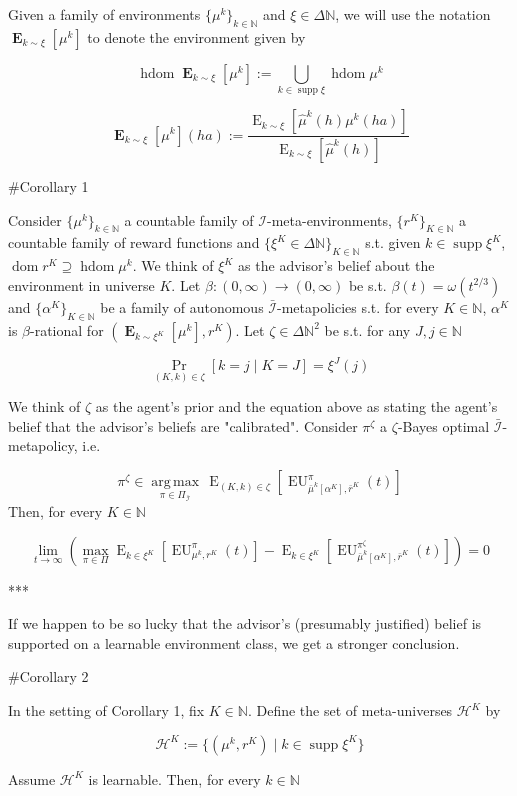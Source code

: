 \documentclass[a4paper]{article}
\DeclareMathOperator{\Supp}{supp}
\DeclareMathOperator{\Dom}{dom}
\newcommand{\E}{\operatorname{E}}
\newcommand{\Argmax}[1]{\underset{#1}{\operatorname{arg\,max}}\,}
\newcommand{\Nats}{\mathbb{N}}
\newcommand{\I}{\mathcal{I}}
\newcommand{\Adi}{\bar{\I}}
\DeclareMathOperator{\HD}{hdom}
\newcommand{\Hy}{\mathcal{H}}
\newcommand{\EU}{\operatorname{EU}}
\begin{document}
Given a family of environments $\{\mu^k\}_{k \in \Nats}$ and $\xi \in \Delta\Nats$, we will use the notation $\boldsymbol{\E}_{k \sim \xi}[\mu^k]$ to denote the environment given by

$$\HD{\boldsymbol{\E}_{k \sim \xi}[\mu^k]}:= \bigcup_{k \in \Supp \xi} \HD{\mu^k}$$

$$\boldsymbol{\E}_{k \sim \xi}[\mu^k](ha):=\frac{\E_{k \sim \xi}[ \hat{\mu}^k(h)\mu^k(ha)]}{\E_{k \sim \xi}[ \hat{\mu}^k(h)]}$$

\#Corollary 1

Consider $\{\mu^k\}_{k \in \Nats}$ a countable family of $\I$-meta-environments, $\{r^K\}_{K \in \Nats}$ a countable family of reward functions and $\{\xi^K \in \Delta\Nats\}_{K \in \Nats}$ s.t. given $k \in \Supp \xi^K$, $\Dom{r^K} \supseteq \HD{\mu^k}$. We think of $\xi^K$ as the advisor's belief about the environment in universe $K$. Let $\beta: (0,\infty) \rightarrow (0,\infty)$ be s.t. $\beta(t) = \omega(t^{2/3})$ and $\{\alpha^K\}_{K \in \Nats}$ be a family of autonomous $\Adi$-metapolicies s.t. for every $K \in \Nats$, $\alpha^K$ is $\beta$-rational for $(\boldsymbol{\E}_{k \sim \xi^K}[\mu^k], r^K)$. Let $\zeta \in \Delta\Nats^2$ be s.t. for any $J,j \in \Nats$ 

$$\Pr_{(K,k) \in \zeta}[k = j \mid K = J] = \xi^J(j)$$ 

We think of $\zeta$ as the agent's prior and the equation above as stating the agent's belief that the advisor's beliefs are "calibrated". Consider $\pi^\zeta$ a $\zeta$-Bayes optimal $\Adi$-metapolicy, i.e.

$$\pi^\zeta \in \Argmax{\pi \in \Pi_{\Adi}}{\E_{(K,k) \in \zeta}[\EU_{\bar{\mu}^k[\alpha^K],\bar{r}^K}^\pi(t)]}$$ 
Then, for every $K \in \Nats$

$$\lim_{t \rightarrow \infty} (\max_{\pi \in \Pi} \E_{k \in \xi^K}[\EU_{\mu^k,r^K}^\pi(t)] - \E_{k \in \xi^K}[\EU_{\bar{\mu}^k[\alpha^K],\bar{r}^K}^{\pi^\zeta}(t)]) = 0$$

***

If we happen to be so lucky that the advisor's (presumably justified) belief is supported on a learnable environment class, we get a stronger conclusion.

\#Corollary 2

In the setting of Corollary 1, fix $K \in \Nats$. Define the set of meta-universes $\Hy^K$ by

$$\Hy^K:= \{(\mu^k, r^K) \mid k \in \Supp \xi^K\}$$

Assume $\Hy^K$ is learnable. Then, for every $k \in \Nats$
\end{document}
